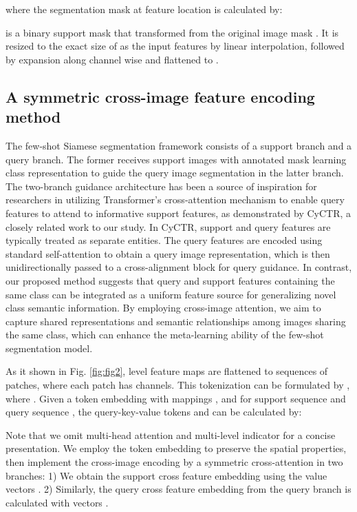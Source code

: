 \documentclass[conference]{IEEEtran}
\begin{document}
where the segmentation mask  at feature location  is calculated by:


 is a binary support mask that transformed from the original image mask . It is resized to the exact size of  as the input features by linear interpolation, followed by expansion along channel wise and flattened to .

\subsection{A symmetric cross-image feature encoding method}
The few-shot Siamese segmentation framework\cite{RN4} consists of a support branch and a query branch. The former receives support images with annotated mask learning class representation to guide the query image segmentation in the latter branch. The two-branch guidance architecture has been a source of inspiration for researchers in utilizing Transformer's cross-attention mechanism to enable query features to attend to informative support features, as demonstrated by CyCTR, a closely related work to our study. In CyCTR, support and query features are typically treated as separate entities. The query features are encoded using standard self-attention to obtain a query image representation, which is then unidirectionally passed to a cross-alignment block for query guidance. In contrast, our proposed method suggests that query and support features containing the same class can be integrated as a uniform feature source for generalizing novel class semantic information. By employing cross-image attention, we aim to capture shared representations and semantic relationships among images sharing the same class, which can enhance the meta-learning ability of the few-shot segmentation model.

As it shown in Fig. \ref{fig:fig2},  level feature maps  are flattened to sequences of  patches, where each patch has  channels. This tokenization can be formulated by , where . Given a token embedding with mappings , and  for support sequence  and query sequence , the query-key-value tokens  and  can be calculated by:

Note that we omit multi-head attention and multi-level indicator for a concise presentation. We employ the token embedding to preserve the spatial properties, then implement the cross-image encoding by a symmetric cross-attention in two branches: 1) We obtain the support cross feature embedding using the value vectors . 2) Similarly, the query cross feature embedding from the query branch is calculated with vectors . 
\end{document}
